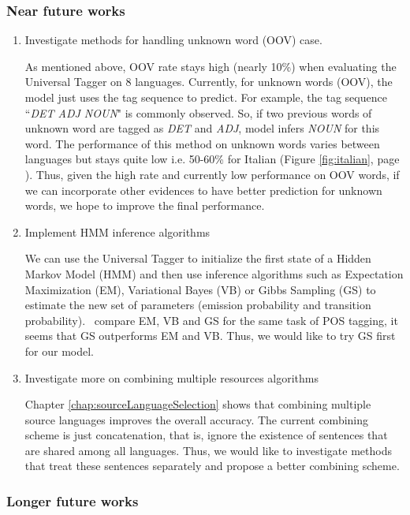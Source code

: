 \subsubsection{Near future works}
\begin{enumerate}
\itemsep0pt
\item Investigate methods for handling unknown word (OOV) case.

As mentioned above, OOV rate stays high (nearly 10\%) when evaluating the Universal Tagger on 8 languages. Currently, for unknown words (OOV), the model just uses the tag sequence to predict. For example, the tag sequence ``\textit{DET ADJ NOUN}" is commonly observed. So, if two previous words of unknown word are tagged as \textit{DET} and \textit{ADJ}, model infers \textit{NOUN} for this word. The performance of this method on unknown words varies between languages but stays quite low i.e. 50-60\% for Italian (Figure \ref{fig:italian}, page \pageref{fig:italian}). Thus, given the high rate and currently low performance on OOV words, if we can incorporate other evidences to have better prediction for unknown words, we hope to improve the final performance. 

\item Implement HMM inference algorithms

We can use the Universal Tagger to initialize the first state of a Hidden Markov Model (HMM) and then use inference algorithms such as  Expectation Maximization (EM),  Variational Bayes (VB) or Gibbs Sampling (GS) to estimate the new set of parameters (emission probability and transition probability).~ compare EM, VB and GS for the same task of POS tagging, it seems that GS outperforms EM and VB. Thus, we would like to try GS first for our model. 

\item Investigate more on combining multiple resources algorithms

Chapter \ref{chap:sourceLanguageSelection} shows that combining multiple source languages improves the overall accuracy. The current combining scheme is just concatenation, that is, ignore the existence of sentences that are shared among all languages. Thus, we would like to investigate methods that treat these sentences separately and propose a better combining scheme. 
\end{enumerate}

\subsubsection{Longer future works}


